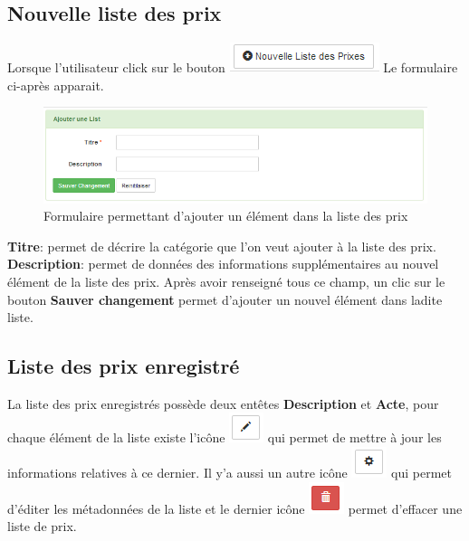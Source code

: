 \documentclass[12pt,a4paper]{report}
\begin{document}
\subsection{Nouvelle liste des prix}
Lorsque l'utilisateur click sur le bouton \includegraphics[scale=0.7]{pic/NewListePrix.png} Le formulaire ci-après apparait.

\begin{figure}[h]
\begin{center}
\includegraphics[width=14cm]{pic/AjouterListePrix.png}
\end{center}
\caption{Formulaire permettant d'ajouter un élément dans la liste des prix}
\label{Formulaire permettant d'ajouter un élément dans la liste des prix}
\end{figure}

\textbf{Titre}: permet de décrire la catégorie que l'on veut ajouter à la liste des prix.
\textbf{Description}: permet de données des informations supplémentaires au nouvel élément de la liste des prix. 
Après avoir renseigné tous ce champ, un clic sur le bouton \textbf{Sauver changement} permet d'ajouter un nouvel élément dans ladite liste.

\subsection{Liste des prix enregistré}

La liste des prix enregistrés possède deux entêtes \textbf{Description} et \textbf{Acte}, pour chaque élément de la liste existe l'icône \includegraphics[scale=0.7]{pic/EditBlack.png}  qui permet de mettre à jour les informations relatives à ce dernier. Il y'a aussi un autre icône  \includegraphics[scale=0.7]{pic/UpdateBlack.png} qui permet d'éditer les métadonnées de la liste et le dernier icône \includegraphics[scale=0.7]{pic/DeleteRed.png}  permet d'effacer une liste de prix.
\end{document}
